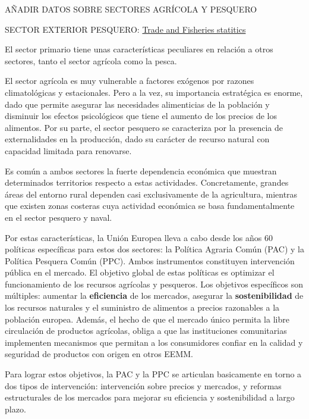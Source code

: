 \documentclass{nuevotema}
\begin{document}
\ideaclave

AÑADIR DATOS SOBRE SECTORES AGRÍCOLA Y PESQUERO

SECTOR EXTERIOR PESQUERO: \href{https://ec.europa.eu/fisheries/facts_figures_en?qt-facts_and_figures=5}{Trade and Fisheries statitics}

El sector primario tiene unas características peculiares en relación a otros sectores, tanto el sector agrícola como la pesca. 

El sector agrícola es muy vulnerable a factores exógenos por razones climatológicas y estacionales. Pero a la vez, su importancia estratégica es enorme, dado que permite asegurar las necesidades alimenticias de la población y disminuir los efectos psicológicos que tiene el aumento de los precios de los alimentos. Por su parte, el sector pesquero se caracteriza por la presencia de externalidades en la producción, dado su carácter de recurso natural con capacidad limitada para renovarse.

Es común a ambos sectores la fuerte dependencia económica que muestran determinados territorios respecto a estas actividades. Concretamente, grandes áreas del entorno rural dependen casi exclusivamente de la agricultura, mientras que existen zonas costeras cuya actividad económica se basa fundamentalmente en el sector pesquero y naval. 

Por estas características, la Unión Europea lleva a cabo desde los años 60 políticas específicas para estos dos sectores: la Política Agraria Común (PAC) y la Política Pesquera Común (PPC). Ambos instrumentos constituyen intervención pública en el mercado. El objetivo global de estas políticas es optimizar el funcionamiento de los recursos agrícolas y pesqueros. Los objetivos específicos son múltiples: aumentar la \textbf{eficiencia} de los mercados, asegurar la \textbf{sostenibilidad} de los recursos naturales y  el suministro de alimentos a precios razonables a la población europea. Además, el hecho de que el mercado único permita la libre circulación de productos agrícolas, obliga a que las instituciones comunitarias implementen mecanismos que permitan a los consumidores confiar en la calidad y seguridad de productos con origen en otros EEMM.

Para lograr estos objetivos, la PAC y la PPC se articulan basicamente en torno a dos tipos de intervención: intervención sobre precios y mercados, y reformas estructurales de los mercados para mejorar su eficiencia y sostenibilidad a largo plazo.
\end{document}
